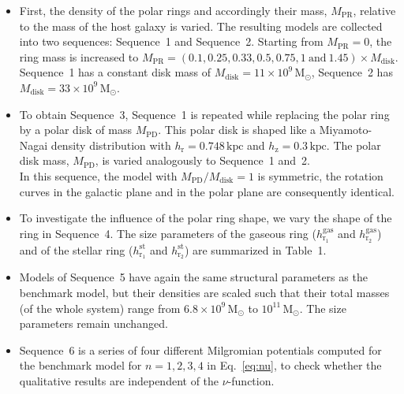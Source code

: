 \documentclass[useAMS,usenatbib]{mn2e}
\newcommand{\Msun}{\ensuremath{\text{M}_\odot}}
\begin{document}
\begin{itemize}
\item First, the density of the polar rings and accordingly their mass, $M_\text{PR}$, relative to the mass of the host galaxy is varied. The resulting models are collected into two sequences: Sequence~1 and Sequence~2. Starting from $M_\text{PR} = 0$, the ring mass is increased to $M_\text{PR} = \left( 0.1, 0.25, 0.33, 0.5, 0.75, 1~\text{and}~1.45\right) \times M_\text{disk}$. Sequence~1 has a constant disk mass of $M_\text{disk} = 11\times 10^9\,\Msun$, Sequence~2 has $M_\text{disk} = 33\times 10^9\,\Msun$.

\item To obtain Sequence~3, Sequence~1 is repeated while replacing the polar ring by a polar disk of mass $M_\text{PD}$. 
This polar disk is shaped like a Miyamoto-Nagai density distribution with $h_\text{r} = 0.748\,\text{kpc}$ and $h_\text{z} = 0.3\,\text{kpc}$. The polar disk mass, $M_\text{PD}$, is varied analogously to Sequence~1 and~2. \\
In this sequence, the model with $M_\text{PD}/M_\text{disk} = 1$ is symmetric, the rotation curves in the galactic plane and in the polar plane are consequently identical.

\item To investigate the influence of the polar ring shape, we vary the shape of the ring in Sequence~4. The size parameters of the gaseous ring ($h_{\text{r}_1}^\text{gas}$ and $h_{\text{r}_2}^\text{gas}$) and of the stellar ring ($h_{\text{r}_1}^\text{st}$ and $h_{\text{r}_2}^\text{st}$) are summarized in Table~1. 

\item Models of Sequence~5 have again the same structural parameters as the benchmark model, but their densities are scaled such that their total masses (of the whole system) range from $6.8\times 10^9\,\Msun$ to $10^{11}\,\Msun$. The size parameters remain unchanged. 

\item Sequence~6 is a series of four different Milgromian potentials computed for the benchmark model for $n=1,2,3,4$ in Eq.~\ref{eq:nu}, to check whether the qualitative results are independent of the $\nu$-function.
\end{itemize}
\end{document}
